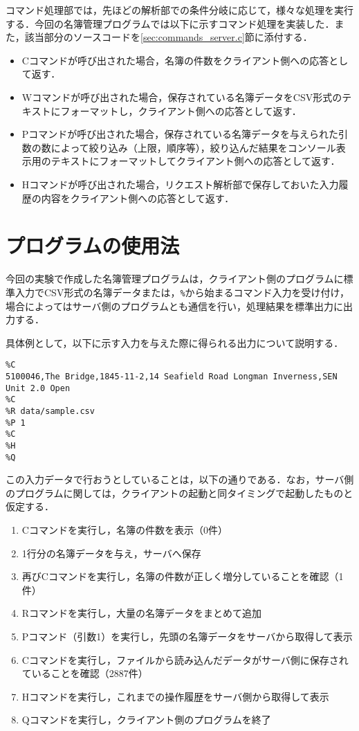 \documentclass[11pt]{jsarticle}
\begin{document}
コマンド処理部では，先ほどの解析部での条件分岐に応じて，様々な処理を実行する．今回の名簿管理プログラムでは以下に示すコマンド処理を実装した．また，該当部分のソースコードを\ref{sec:commands_server.c}節に添付する．

\begin{itemize}
      \item Cコマンドが呼び出された場合，名簿の件数をクライアント側への応答として返す．
      \item Wコマンドが呼び出された場合，保存されている名簿データをCSV形式のテキストにフォーマットし，クライアント側への応答として返す．
      \item Pコマンドが呼び出された場合，保存されている名簿データを与えられた引数の数によって絞り込み（上限，順序等），絞り込んだ結果をコンソール表示用のテキストにフォーマットしてクライアント側への応答として返す．
      \item Hコマンドが呼び出された場合，リクエスト解析部で保存しておいた入力履歴の内容をクライアント側への応答として返す．
\end{itemize}

\section{プログラムの使用法}

今回の実験で作成した名簿管理プログラムは，クライアント側のプログラムに標準入力でCSV形式の名簿データまたは，{\tt \%}から始まるコマンド入力を受け付け，場合によってはサーバ側のプログラムとも通信を行い，処理結果を標準出力に出力する．

具体例として，以下に示す入力を与えた際に得られる出力について説明する．

{\small
\begin{verbatim}
%C
5100046,The Bridge,1845-11-2,14 Seafield Road Longman Inverness,SEN Unit 2.0 Open
%C
%R data/sample.csv
%P 1
%C
%H
%Q
\end{verbatim}
}

この入力データで行おうとしていることは，以下の通りである．なお，サーバ側のプログラムに関しては，クライアントの起動と同タイミングで起動したものと仮定する．

\begin{enumerate}
      \item Cコマンドを実行し，名簿の件数を表示（0件）
      \item 1行分の名簿データを与え，サーバへ保存
      \item 再びCコマンドを実行し，名簿の件数が正しく増分していることを確認（1件）
      \item Rコマンドを実行し，大量の名簿データをまとめて追加
      \item Pコマンド（引数1）を実行し，先頭の名簿データをサーバから取得して表示
      \item Cコマンドを実行し，ファイルから読み込んだデータがサーバ側に保存されていることを確認（2887件）
      \item Hコマンドを実行し，これまでの操作履歴をサーバ側から取得して表示
      \item Qコマンドを実行し，クライアント側のプログラムを終了
\end{enumerate}
\end{document}
